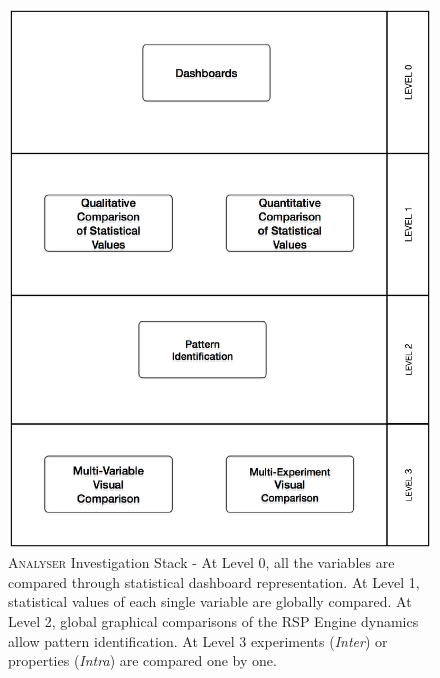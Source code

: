 \begin{figure}[htb]
  \centering
	\includegraphics[width=0.8\linewidth]{images/analysis-method}
	\caption[\textsc{Analyser} Investigation Stack]{\textsc{Analyser} Investigation Stack - At Level 0, all the variables are compared through statistical dashboard representation. At Level 1, statistical values of each single variable are globally compared. At Level 2, global graphical comparisons of the RSP Engine dynamics allow pattern identification. At Level 3 experiments (\textit{Inter}) or properties (\textit{Intra}) are compared one by one.}
  	\label{fig:analysis-method}
\end{figure}



